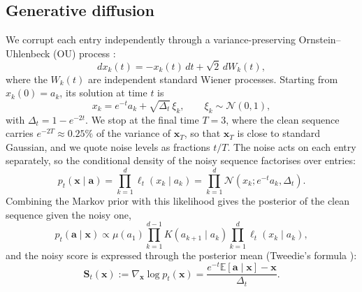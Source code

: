 \documentclass{article}
\begin{document}
\subsection{Generative diffusion}
\label{sec:diffusion}
We corrupt each entry independently through a variance-preserving Ornstein--Uhlenbeck (OU) process
\cite{song2021scorebased}:
\begin{equation}
dx_k(t)=-x_k(t)\,dt+\sqrt{2}\,dW_k(t),
\end{equation}
where the $W_k(t)$ are independent standard Wiener processes. Starting from $x_k(0)=a_k$, its solution at time $t$ is
\begin{equation}
x_k=e^{-t}a_k+\sqrt{\Delta_t}\,\xi_k,
\qquad
\xi_k\sim\mathcal{N}(0,1),
\label{eq:ou_corruption}
\end{equation}
with $\Delta_t=1-e^{-2t}$. We stop at the final time $T=3$, where the clean sequence carries $e^{-2T}\approx0.25\%$ of the variance of $\mathbf x_T$, so that $\mathbf x_T$ is close to standard Gaussian, and we quote noise levels as fractions $t/T$. The noise acts on each entry separately, so the conditional density of the noisy sequence
factorises over entries:
\begin{equation}
p_t(\mathbf{x}\mid\mathbf{a})
=
\prod_{k=1}^{d}
\ell_t(x_k\mid a_k)
=\prod_{k=1}^{d}\mathcal{N}(x_k;e^{-t}a_k,\Delta_t).
\label{eq:ou_likelihood}
\end{equation}
Combining the Markov prior with this likelihood gives the posterior of the clean sequence given the noisy one,
\begin{equation}
p_t(\mathbf{a}\mid\mathbf{x})
\propto
\mu(a_1)
\prod_{k=1}^{d-1}K(a_{k+1}\mid a_k)
\prod_{k=1}^{d}\ell_t(x_k\mid a_k),
\label{eq:posterior_chain}
\end{equation}
and the noisy score is expressed through the posterior mean (Tweedie's formula
\cite{robbins1956empirical,efron2011tweedie}):
\begin{equation}
    \mathbf S_t(\mathbf x)
    := \nabla_{\mathbf x}\log p_t(\mathbf x)
    =
    \frac{e^{-t}\mathbb E[\mathbf a\mid\mathbf x]-\mathbf x}
         {\Delta_t}.
    \label{eq:tweedie}
\end{equation}
\end{document}
